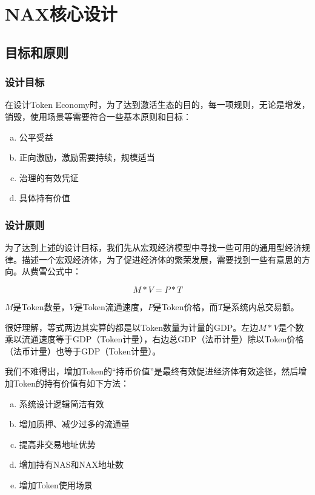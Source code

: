 \section{NAX核心设计}
\subsection{目标和原则}
\subsubsection{设计目标}
在设计Token Economy时，为了达到激活生态的目的，每一项规则，无论是增发，销毁，使用场景等需要符合一些基本原则和目标：

\begin{enumerate}[a.]
    \item 公平受益
    \item 正向激励，激励需要持续，规模适当
    \item 治理的有效凭证
    \item 具体持有价值
\end{enumerate}

\subsubsection{设计原则}
为了达到上述的设计目标，我们先从宏观经济模型中寻找一些可用的通用型经济规律。描述一个宏观经济体，为了促进经济体的繁荣发展，需要找到一些有意思的方向。从费雪公式中：

\begin{equation}
M * V = P * T
\end{equation}

\(M\)是Token数量，\(V\)是Token流通速度，\(P\)是Token价格，而\(T\)是系统内总交易额。

很好理解，等式两边其实算的都是以Token数量为计量的GDP。左边\(M * V\)是个数乘以流通速度等于GDP（Token计量），右边总GDP（法币计量）除以Token价格（法币计量）也等于GDP（Token计量）。

我们不难得出，增加Token的“持币价值”是最终有效促进经济体有效途径，然后增加Token的持有价值有如下方法：

\begin{enumerate}[a.]
	\item 系统设计逻辑简洁有效
	\item 增加质押、减少过多的流通量
	\item 提高非交易地址优势
	\item 增加持有NAS和NAX地址数
	\item 增加Token使用场景
\end{enumerate}

